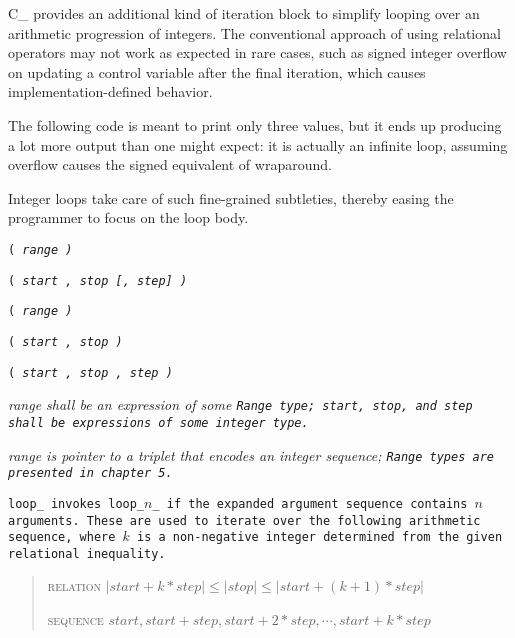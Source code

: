 C\_ provides an additional kind of iteration block to
simplify looping over an arithmetic progression of integers.
The conventional approach of using relational operators may not work as expected
in rare cases, such as signed integer overflow on updating a control variable
after the final iteration, which causes implementation-defined behavior.

\example The following code is meant to print only three values,
but it ends up producing a lot more output than one might expect: it is actually
an infinite loop, assuming overflow causes the signed equivalent of wraparound.


Integer loops take care of such fine-grained subtleties,
thereby easing the programmer to focus on the loop body.


\s\s\s\tt{(} \it{range} \tt{)}

\s\s\s\tt{(} \it{start} \tt{,} \it{stop} [\tt{,} \it{step}] \tt{)}

\s\tt{(}   \it{range} \tt{)}

\s\tt{(}   \it{start} \tt{,} \it{stop} \tt{)}

\s\tt{(}   \it{start} \tt{,} \it{stop} \tt{,} \it{step} \tt{)}


\it{range} shall be an expression of some \tt{Range} type; \it{start},
\it{stop}, and \it{step} shall be expressions of some integer type.

\note \it{range} is pointer to a triplet that encodes an integer sequence;
\tt{Range} types are presented in chapter 5.


\tt{loop_} invokes \tt{loop_}$n$\_ if the
expanded argument sequence contains $n$ arguments.
These are used to iterate over the following arithmetic sequence, where $k$
is a non-negative integer determined from the given relational inequality.

\begin{quotation}
\textsc{relation}\indent
$|start + k*step| \le |stop| \le |start + (k+1)*step|$

\textsc{sequence}\indent
$start, start + step, start + 2*step, \cdots, start + k*step$
\end{quotation}

